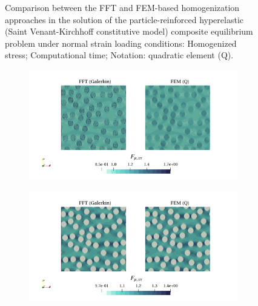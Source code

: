 \begin{figure}[hbt]
\begin{subfigure}[b]{0.49\textwidth}
    \caption{}
    \label{subfig:svk_2D_normal_stress_avg_cpu_time_vs_n_voxels}
  \end{subfigure}
  \caption{Comparison between the FFT and FEM-based homogenization approaches in the solution of the particle-reinforced hyperelastic (Saint Venant-Kirchhoff constitutive model) composite equilibrium problem under normal strain loading conditions:  Homogenized stress;  Computational time; Notation: quadratic element (Q).}
\label{fig:svk_2D_normal_stiff_contrast}
\end{figure}

\begin{figure}[hbt]
  \centering
	\begin{subfigure}[b]{\textwidth}
    \centering
    \includegraphics[width=\textwidth]{figures/svk_2D_ratio_-4_normal_strain_11}
    \caption{}
    \label{subfig:svk_2D_ratio_4_normal_strain_11}
  \end{subfigure}
  \begin{subfigure}[b]{\textwidth}
    \centering
    \includegraphics[width=\textwidth]{figures/svk_2D_ratio_4_normal_strain_11}

\end{subfigure}
\end{figure}
